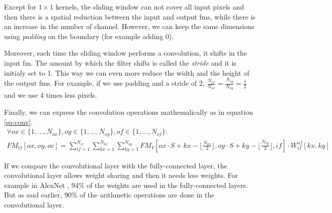 Except for $1 \times 1$ kernels, the sliding window can not cover all input pixels and then there is a spatial reduction between the input and output \acrshort{fm}s, while there is an increase in the number of channel. However, we can keep the same dimensions using \textit{padding} on the boundary (for example adding 0).

Moreover, each time the sliding window performs a convolution, it shifts in the input \acrshort{fm}. The amount by which the filter shifts is called the \textit{stride} and it is initialy set to 1. This way we can even more reduce the width and the height of the output \acrshort{fm}s. For example, if we use padding and a stride of 2, $\frac{N_{ix}}{N_{ox}} = \frac{N_{iy}}{N_{oy}} = \frac{1}{2}$ and we use 4 times less pixels.

Finally, we can express the convolution operations mathemalically as in equation \eqref{eq:conv}.
    \begin{multline}
        \forall ox \in \{ 1, ..., N_{ox} \}, oy \in \{ 1, ..., N_{oy} \}, of \in \{ 1, ..., N_{of} \} : \\
        FM_O[ox, oy, oc] = \sum^{N_{if}}_{if=1}
        \sum^{N_{kx}}_{kx=1}
        \sum^{N_{ky}}_{ky=1}
        FM_I[ox \cdot S + kx - \lfloor \frac{N_{kx}}{2} \rfloor,  oy \cdot S + ky - \lfloor \frac{N_{ky}}{2} \rfloor, if] \cdot
        W^{of}_{if}[kx, ky]
        \label{eq:conv}
    \end{multline}

If we compare the convolutional layer with the fully-connected layer, the convolutional layer allows weight sharing and then it needs less weights. For example in AlexNet \cite{krizhevsky_imagenet_2012}, 94\% of the weights are used in the fully-connected layers. But as said earlier, 90\% of the arithmetic operations are done in the convolutional layer.
